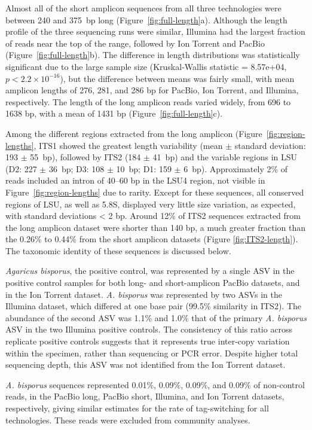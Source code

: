\documentclass[
  12pt,
]{article}
\begin{document}
Almost all of the short amplicon sequences from all three technologies were between 240 and 375~bp long (Figure~\ref{fig:full-length}a).
Although the length profile of the three sequencing runs were similar, Illumina had the largest fraction of reads near the top of the range, followed by Ion Torrent and PacBio (Figure~\ref{fig:full-length}b).
The difference in length distributions was statistically significant due to the large sample size (Kruskal-Wallis statistic = 8.57e+04, \(p < 2.2\times10^{-16}\)),
but the difference between means was fairly small, with mean amplicon lengths of 276, 281, and 286 bp for PacBio, Ion Torrent, and Illumina, respectively.
The length of the long amplicon reads varied widely, from 696 to 1638 bp, with a mean of 1431 bp (Figure~\ref{fig:full-length}c).

Among the different regions extracted from the long amplicon (Figure~\ref{fig:region-lengths},
ITS1 showed the greatest length variability (mean \(\pm\) standard deviation: 193 \(\pm\) 55~bp), followed by ITS2 (184 \(\pm\) 41~bp) and the variable regions in LSU (D2: 227 \(\pm\) 36~bp; D3: 108 \(\pm\) 10~bp; D1: 159 \(\pm\) 6~bp).
Approximately 2\% of reads included an intron of 40--60 bp in the LSU4 region, not visible in Figure~\ref{fig:region-lengths} due to rarity.
Except for these sequences, all conserved regions of LSU, as well as 5.8S, displayed very little size variation, as expected, with standard deviations \textless{} 2 bp.
Around 12\% of ITS2 sequences extracted from the long amplicon dataset were shorter than 140 bp, a much greater fraction than the 0.26\% to 0.44\% from the short amplicon datasets (Figure \ref{fig:ITS2-length}).
The taxonomic identity of these sequences is discussed below.

\emph{Agaricus bisporus}, the positive control, was represented by a single ASV in the positive control samples for both long- and short-amplicon PacBio datasets, and in the Ion Torrent dataset.
\emph{A. bisporus} was represented by two ASVs in the Illumina dataset, which differed at one base pair (99.5\% similarity in ITS2).
The abundance of the second ASV was 1.1\% and 1.0\% that of the primary \emph{A. bisporus} ASV in the two Illumina positive controls.
The consistency of this ratio across replicate positive controls suggests that it represents true inter-copy variation within the specimen, rather than sequencing or PCR error.
Despite higher total sequencing depth, this ASV was not identified from the Ion Torrent dataset.

\emph{A. bisporus} sequences represented 0.01\%, 0.09\%, 0.09\%, and 0.09\% of non-control reads, in the PacBio long, PacBio short, Illumina, and Ion Torrent datasets, respectively, giving similar estimates for the rate of tag-switching for all technologies.
These reads were excluded from community analyses.
\end{document}
